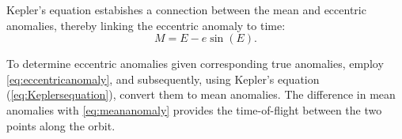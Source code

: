 Kepler's equation estabishes a connection between the mean and eccentric anomalies, thereby linking
the eccentric anomaly to time:
\begin{equation}
    M=E-e\sin(E).
    \label{eq:Keplersequation}
\end{equation}

To determine eccentric anomalies given corresponding true anomalies, employ
\cref{eq:eccentricanomaly}, and subsequently, using Kepler's equation (\cref{eq:Keplersequation}),
convert them to mean anomalies. The difference in mean anomalies with \cref{eq:meananomaly}
provides the time-of-flight between the two points along the orbit.
